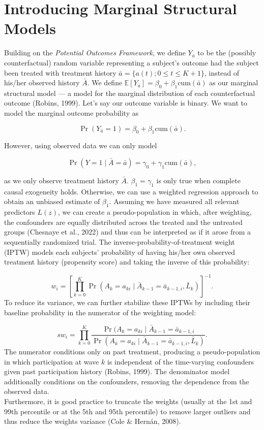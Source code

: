\documentclass[
  letterpaper,
  DIV=11,
  numbers=noendperiod]{scrartcl}
\begin{document}
\section{Introducing Marginal Structural
Models}\label{introducing-marginal-structural-models}

Building on the \emph{Potential Outcomes Framework}, we define
\(Y_{\bar a}\) to be the (possibly counterfactual) random variable
representing a subject's outcome had the subject been treated with
treatment history \(\bar a = \{a(t); 0 \leq t \leq K+1 \}\), instead of
his/her observed history \(\bar A\). We define
\(\mathbb{E}[Y_{\bar a}] = \beta_0 + \beta_1 \text{cum}(\bar a)\) as our
marginal structural model --- a model for the marginal distribution of
each counterfactual outcome (Robins, 1999). Let's say our outcome
variable is binary. We want to model the marginal outcome probability as

\[\Pr(Y_{\bar a} = 1) = \beta_0 + \beta_1 \text{cum}(\bar a).\]

However, using observed data we can only model

\[\Pr(Y = 1 \mid \bar A = \bar a) = \gamma_0 + \gamma_1 \text{cum}(\bar a),\]

as we only observe treatment history \(\bar A\). \(\beta_1 = \gamma_1\)
is only true when complete causal exogeneity holds. Otherwise, we can
use a weighted regression approach to obtain an unbiased estimate of
\(\beta_1\). Assuming we have measured all relevant predictors \(L(z)\),
we can create a pseudo-population in which, after weighting, the
confounders are equally distributed across the treated and the untreated
groups (Chesnaye et al., 2022) and thus can be interpreted as if it
arose from a sequentially randomized trial. The
inverse-probability-of-treatment weight (IPTW) models each subjects'
probability of having his/her own observed treatment history (propensity
score) and taking the inverse of this probability:

\[w_i = \left[\prod_{k=0}^K \Pr(A_k = a_{ki} \mid \bar A_{k-1} = \bar a_{k-1, i}, \bar L_k)\right]^{-1}.\]
To reduce its variance, we can further stabilize these IPTWs by
including their baseline probability in the numerator of the weighting
model:

\[sw_i = \prod_{k=0}^K\frac{\Pr(A_k = a_{ki} \mid \bar A_{k-1} = \bar a_{k-1, i}} {\Pr(A_k = a_{ki} \mid \bar A_{k-1} = \bar a_{k-1, i}, \bar L_k)}.\]
The numerator conditions only on past treatment, producing a
pseudo-population in which participation at wave \(k\) is independent of
the time-varying confounders given past participation history (Robins,
1999). The denominator model additionally conditions on the confounders,
removing the dependence from the observed data.\\
Furthermore, it is good practice to truncate the weights (usually at the
1st and 99th percentile or at the 5th and 95th percentile) to remove
larger outliers and thus reduce the weights variance (Cole \& Hernán,
2008).
\end{document}
